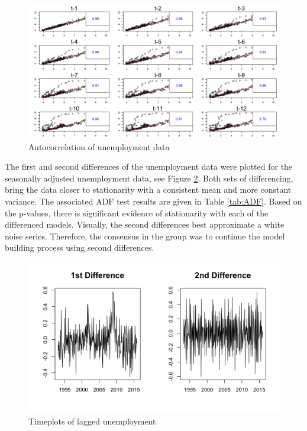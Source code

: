 \documentclass[twoside,twocolumn]{article}
\begin{document}
		\begin{figure}[htb]
		\centering
		\caption{Autocorrelation of unemployment data}
		\label{fig:laggedunemployment}
		\includegraphics[width=\linewidth]{images/laggedunemployment}
	\end{figure}
The first and second differences of the unemployment data were plotted for the seasonally adjusted unemployment data, see Figure \ref{fig:seasonalunem}. Both sets of differencing, bring the data closer to stationarity with a consistent mean and more constant variance. The associated ADF test results are given in Table \ref{tab:ADF}. Based on the p-values, there is significant evidence of stationarity with each of the differenced models. Visually, the second differences best approximate a white noise series. Therefore, the consensus in the group was to continue the model building process using second differences.
	\begin{figure}[htb]
		\centering
		\caption{Timeplots of lagged unemployment}
		\label{fig:seasonalunem}
		\includegraphics[width=\linewidth]{images/seasonalunem}
	\end{figure}
		 
\end{document}
